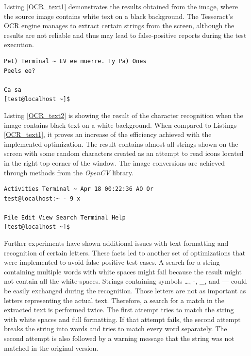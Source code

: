 Listing \ref{OCR_text1} demonstrates the results obtained from the image, where the source image contains white text on a black background. The Tesseract's OCR engine manages to extract certain strings from the screen, although the results are not reliable and thus may lead to false-positive reports during the test execution.  

\begin{lstlisting}[caption={Text generated from the binarized image in Figure \ref{ocr_conversion}},label={OCR_text1}]
Pet) Terminal ~ EV ee muerre. Ty Pa) Ones
Peels ee?

Ca sa
[test@localhost ~]$ 
\end{lstlisting}

Listing \ref{OCR_text2} is showing the result of the character recognition when the image contains black text on a white background. When compared to Listings \ref{OCR_text1}, it proves an increase of the efficiency achieved with the implemented optimization. The result contains almost all strings shown on the screen with some random characters created as an attempt to read icons located in the right top corner of the window. The image conversions are achieved through methods from the \textit{OpenCV} library. 

\begin{lstlisting}[caption={Text generated from the inverted binarized image in Figure \ref{ocr_conversion}},label={OCR_text2}]
 Activities Terminal ~ Apr 18 00:22:36 AO Or
test@localhost:~ - 9 x

File Edit View Search Terminal Help
[test@localhost ~]$
\end{lstlisting}

Further experiments have shown additional issues with text formatting and recognition of certain letters. These facts led to another set of optimizations that were implemented to avoid false-positive test cases. A search for a string containing multiple words with white spaces might fail because the result might not contain all the white-spaces. Strings containing symbols …, -, \_, and — could be easily exchanged during the recognition. Those letters are not as important as letters representing the actual text. Therefore, a search for a match in the extracted text is performed twice. The first attempt tries to match the string with white spaces and full formatting. If that attempt fails, the second attempt breaks the string into words and tries to match every word separately. The second attempt is also followed by a warning message that the string was not matched in the original version.

